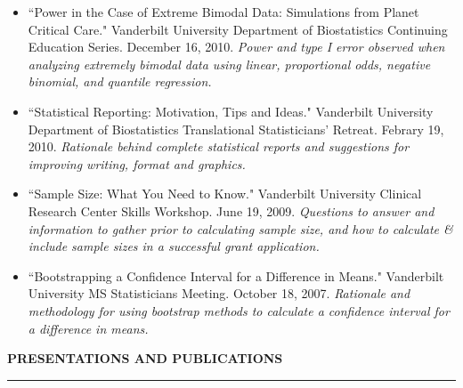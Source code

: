 \documentclass[5pt]{article}
\begin{document}
\begin{itemize}
\item ``Power in the Case of Extreme Bimodal Data: Simulations from Planet Critical Care." Vanderbilt University Department of Biostatistics Continuing Education Series. December 16, 2010. \emph{Power and type I error observed when analyzing extremely bimodal data using linear, proportional odds, negative binomial, and quantile regression.}
\item ``Statistical Reporting: Motivation, Tips and Ideas." Vanderbilt University Department of Biostatistics Translational Statisticians’ Retreat. Febrary 19, 2010. \emph{Rationale behind complete statistical reports and suggestions for improving writing, format and graphics.}
\item ``Sample Size: What You Need to Know." Vanderbilt University Clinical Research Center Skills Workshop. June 19, 2009. \emph{Questions to answer and information to gather prior to calculating sample size, and how to calculate \& include sample sizes in a successful grant application.}
\item ``Bootstrapping a Confidence Interval for a Difference in Means." Vanderbilt University MS Statisticians Meeting. October 18, 2007. \emph{Rationale and methodology for using bootstrap methods to calculate a confidence interval for a difference in means.}
\end{itemize}

\noindent \linebreak \textbf{PRESENTATIONS AND PUBLICATIONS}\\
\rule[5pt]{\linewidth}{1.0pt}
\end{document}
